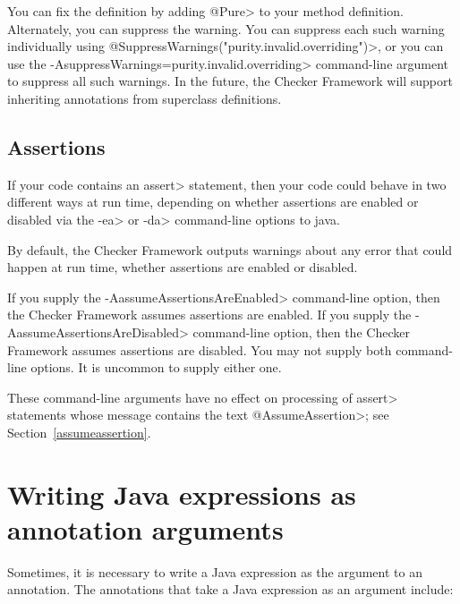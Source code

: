You can fix the definition by adding \<@Pure> to your method definition.
Alternately, you can suppress the warning.
You can suppress each such warning individually using
\<@SuppressWarnings("purity.invalid.overriding")>,
or you can use the \<-AsuppressWarnings=purity.invalid.overriding>
command-line argument to suppress all such warnings.
In the future, the Checker Framework will support inheriting annotations
from superclass definitions.


\subsection{Assertions\label{type-refinement-assertions}}

If your code contains an \<assert> statement, then your code could behave
in two different ways at run time, depending on whether assertions are
enabled or disabled
via the \<-ea> or \<-da> command-line options to java.

By default, the Checker Framework outputs warnings about any error that
could happen at run time, whether assertions are enabled or disabled.

If you supply the \<-AassumeAssertionsAreEnabled> command-line option, then
the Checker Framework assumes assertions are enabled.  If you supply the
\<-AassumeAssertionsAreDisabled> command-line option, then the Checker
Framework assumes assertions are disabled.  You may not supply both
command-line options.  It is uncommon to supply either one.

These command-line arguments have no effect on processing of \<assert>
statements whose message contains the text \<@AssumeAssertion>; see
Section~\ref{assumeassertion}.


\section{Writing Java expressions as annotation arguments\label{java-expressions-as-arguments}}

Sometimes, it is necessary to write a Java expression as the argument to an
annotation.  The annotations that take a Java
expression as an argument include:

